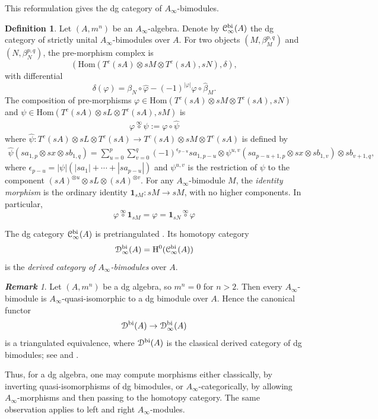 \documentclass[a4paper, 11pt]{amsart}
\theoremstyle{definition}
\newtheorem{defn}[thm]{Definition}
\theoremstyle{remark}
\newtheorem{rem}[thm]{\bf Remark}
\numberwithin{equation}{section}
\newcommand{\BB}{\mathrm{bi}}
\newcommand{\Hom}{\mathrm{Hom}}
\newcommand{\id}{\mathbf{1}}
\newcommand{\EC}{\EuScript{C}}
\newcommand{\ED}{\EuScript{D}}
\begin{document}
This reformulation gives the dg category of $A_\infty$-bimodules.

\begin{defn}
Let $(A,m^n)$ be an $A_\infty$-algebra. Denote by $\EC^{\BB}_\infty(A)$ the dg category of strictly unital $A_\infty$-bimodules over $A$. For two objects $(M,\beta_M^{p,q})$ and $(N,\beta_N^{p,q})$, the pre-morphism complex is
\[
(\Hom(T^c(sA)\otimes sM\otimes T^c(sA),sN),\delta),
\]
with differential
\[
\delta(\varphi)=\beta_N\circ \widehat\varphi-(-1)^{|\varphi|}\varphi\circ \widehat\beta_M.
\]
The composition of pre-morphisms $\varphi\in \Hom(T^c(sA)\otimes sM\otimes T^c(sA),sN)$ and $\psi\in \Hom(T^c(sA)\otimes sL\otimes T^c(sA),sM)$ is
\begin{align}\label{align:compositionmorphisms}
 \varphi\overset{\infty}{\circ} \psi := \varphi \circ \widehat \psi
\end{align}
where $\widehat\psi\colon T^c(sA)\otimes sL\otimes T^c(sA)\to T^c(sA)\otimes sM\otimes T^c(sA)$ is defined by
\begin{align*}
\widehat \psi(sa_{1,p} \otimes sx \otimes sb_{1,q})= \sum_{u=0}^p\sum_{v=0}^q (-1)^{\epsilon_{p-u}} sa_{1,p-u} \otimes \psi^{u, v}(sa_{p-u+1, p} \otimes sx \otimes sb_{1,v}) \otimes sb_{v+1,q} ,
\end{align*}
where $\epsilon_{p-u} = |\psi| ( |sa_1|+\dotsb+|sa_{p-u}|)$ and $\psi^{u, v}$ is the restriction of $\psi$ to the component $(sA)^{\otimes u} \otimes s L \otimes (sA)^{\otimes v}.$
For any $A_\infty$-bimodule $M$, the {\it identity morphism} is the ordinary identity $\id_{sM}\colon sM\to sM$, with no higher components. In particular,
\[
 \varphi \overset{\infty}{\circ} \id_{sM}=\varphi=\id_{sN} \overset{\infty}{\circ} \varphi
\]

The dg category $\EC^{\BB}_\infty(A)$ is pretriangulated \cite{Kel01a}. Its homotopy category
\[
\ED^{\BB}_{\infty}(A)=\mathrm H^0(\EC^{\BB}_\infty(A))
\]
is the {\it derived category of $A_\infty$-bimodules} over $A$.
\end{defn}

\begin{rem}\label{rem:Ainfinitydgmodules}
Let $(A,m^n)$ be a dg algebra, so $m^n=0$ for $n>2$. Then every $A_\infty$-bimodule is $A_\infty$-quasi-isomorphic to a dg bimodule over $A$. Hence the canonical functor
\[
\ED^{\BB}(A)\to \ED^{\BB}_{\infty}(A)
\]
is a triangulated equivalence, where $\ED^{\BB}(A)$ is the classical derived category of dg bimodules; see \cite[Subsection 4.3]{Kel01} and \cite{Kel94}.

Thus, for a dg algebra, one may compute morphisms either classically, by inverting quasi-isomorphisms of dg bimodules, or $A_\infty$-categorically, by allowing $A_\infty$-morphisms and then passing to the homotopy category. The same observation applies to left and right $A_\infty$-modules.
\end{rem}
\end{document}
